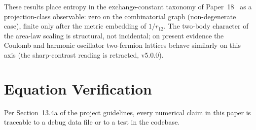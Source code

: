 \documentclass[twocolumn,pra,amsmath,amssymb,superscriptaddress]{revtex4-2}
\begin{document}
These results place entropy in the exchange-constant
taxonomy of Paper~18~\cite{GeoVac_Paper18} as a
projection-class observable: zero on the combinatorial graph
(non-degenerate case),
finite only after the metric embedding of $1/r_{12}$.  The
two-body character of the area-law scaling is structural, not
incidental; on present evidence the Coulomb and harmonic
oscillator two-fermion lattices behave similarly on this axis (the sharp-contrast reading is retracted, v5.0.0).

\section*{Equation Verification}

Per Section~13.4a of the project guidelines, every numerical
claim in this paper is traceable to a debug data file or to a
test in the codebase.
\end{document}
